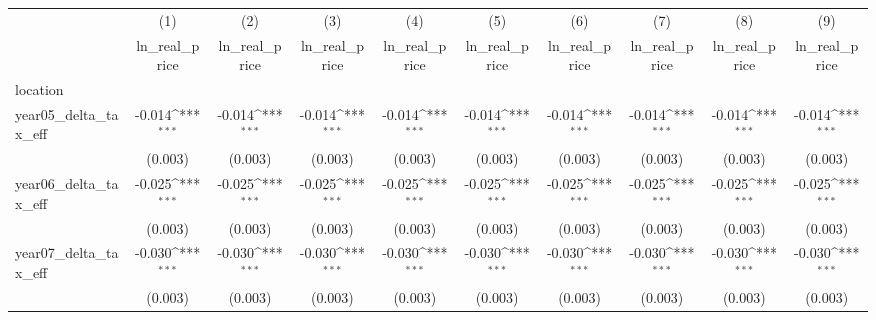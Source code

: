 {
\def\sym#1{\ifmmode^{#1}\else\(^{#1}\)\fi}
\begin{tabular}{l*{9}{c}}
\hline\hline
            &\multicolumn{1}{c}{(1)}&\multicolumn{1}{c}{(2)}&\multicolumn{1}{c}{(3)}&\multicolumn{1}{c}{(4)}&\multicolumn{1}{c}{(5)}&\multicolumn{1}{c}{(6)}&\multicolumn{1}{c}{(7)}&\multicolumn{1}{c}{(8)}&\multicolumn{1}{c}{(9)}\\
            &\multicolumn{1}{c}{ln\_real\_price}&\multicolumn{1}{c}{ln\_real\_price}&\multicolumn{1}{c}{ln\_real\_price}&\multicolumn{1}{c}{ln\_real\_price}&\multicolumn{1}{c}{ln\_real\_price}&\multicolumn{1}{c}{ln\_real\_price}&\multicolumn{1}{c}{ln\_real\_price}&\multicolumn{1}{c}{ln\_real\_price}&\multicolumn{1}{c}{ln\_real\_price}\\
\hline
location    &                     &                     &                     &                     &                     &                     &                     &                     &                     \\
year05\_delta\_tax\_eff&      -0.014\sym{***}&      -0.014\sym{***}&      -0.014\sym{***}&      -0.014\sym{***}&      -0.014\sym{***}&      -0.014\sym{***}&      -0.014\sym{***}&      -0.014\sym{***}&      -0.014\sym{***}\\
            &     (0.003)         &     (0.003)         &     (0.003)         &     (0.003)         &     (0.003)         &     (0.003)         &     (0.003)         &     (0.003)         &     (0.003)         \\
[1em]
year06\_delta\_tax\_eff&      -0.025\sym{***}&      -0.025\sym{***}&      -0.025\sym{***}&      -0.025\sym{***}&      -0.025\sym{***}&      -0.025\sym{***}&      -0.025\sym{***}&      -0.025\sym{***}&      -0.025\sym{***}\\
            &     (0.003)         &     (0.003)         &     (0.003)         &     (0.003)         &     (0.003)         &     (0.003)         &     (0.003)         &     (0.003)         &     (0.003)         \\
[1em]
year07\_delta\_tax\_eff&      -0.030\sym{***}&      -0.030\sym{***}&      -0.030\sym{***}&      -0.030\sym{***}&      -0.030\sym{***}&      -0.030\sym{***}&      -0.030\sym{***}&      -0.030\sym{***}&      -0.030\sym{***}\\
            &     (0.003)         &     (0.003)         &     (0.003)         &     (0.003)         &     (0.003)         &     (0.003)         &     (0.003)         &     (0.003)         &     (0.003)         \\
[1em]

\end{tabular}}
